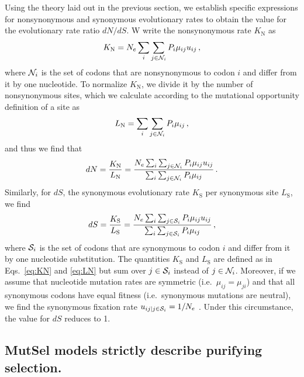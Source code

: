 \documentclass[11pt]{article}
\begin{document}
Using the theory laid out in the previous section, we establish specific expressions for nonsynonymous and synonymous evolutionary rates to obtain the value for the evolutionary rate ratio $dN/dS$. W write the nonsynonymous rate $K_\text{N}$ as 
\begin{equation}\label{eq:KN}
	K_\text{N} = N_e \sum_i \sum_{j \in {\cal N}_i} P_i \mu_{ij} u_{ij} \,,
\end{equation}
where ${\cal N}_i$ is the set of codons that are nonsynonymous to codon $i$ and differ from it by one nucleotide. To normalize $K_\text{N}$, we divide it by the number of nonsynonymous sites, which we calculate according to the mutational opportunity definition of a site \cite{GoldmanYang1994, Yang2006} as 
\begin{equation}\label{eq:LN}
	L_\text{N} = \sum_i \sum_{j \in {\cal N}_i} P_i \mu_{ij}\,, 
\end{equation} and thus we find that 
\begin{equation}\label{eq:dN}
	dN = \frac{K_\text{N}}{L_\text{N}}=\frac{N_e \sum_i \sum_{j \in {\cal N}_i} P_i \mu_{ij} u_{ij} } {\sum_i \sum_{j \in {\cal N}_i}P_i \mu_{ij}}\,.
\end{equation} Similarly, for $dS$, the synonymous evolutionary rate $K_\text{S}$ per synonymous site $L_\text{S}$, we find
\begin{equation}\label{eq:dS}
	dS = \frac{K_\text{S}}{L_\text{S}}=\frac{ N_e \sum_i \sum_{j \in {\cal S}_i} P_i \mu_{ij} u_{ij} } {\sum_i \sum_{j \in {\cal S}_i} P_i \mu_{ij} }\,,
\end{equation}
where ${\cal S}_i$ is the set of codons that are synonymous to codon $i$ and differ from it by one nucleotide substitution. The quantities $K_\text{S}$ and $L_\text{S}$ are defined as in Eqs.~\eqref{eq:KN} and \eqref{eq:LN} but sum over $j\in {\cal S}_i$ instead of $j\in {\cal N}_i$. Moreover, if we assume that nucleotide mutation rates are symmetric (i.e.\ $\mu_{ij} = \mu_{ji}$) and that all synonymous codons have equal fitness (i.e.\ synonymous mutations are neutral), we find the synonymous fixation rate $u_{ij | j \in {\cal S}_i} = 1/N_e$ \cite{CrowKimura1970}. Under this circumstance, the value for $dS$ reduces to 1.
		
				
\subsection*{MutSel models strictly describe purifying selection.}
\end{document}
